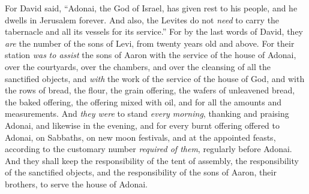 \begin{biblechapter}
\verse For David said, “Adonai, the God of Israel, has given rest to his people, and he dwells in Jerusalem forever.
\verse And also, the Levites do not \textit{need} to carry the tabernacle and all its vessels for its service.”
\verse For by the last words of David, they \textit{are} the number of the sons of Levi, from twenty years old and above.
\verse For their station \textit{was} \textit{to assist} the sons of Aaron with the service of the house of Adonai, over the courtyards, over the chambers, and over the cleansing of all the sanctified objects, and \textit{with} the work of the service of the house of God,
\verse and with the rows of bread, the flour, the grain offering, the wafers of unleavened bread, the baked offering, the offering mixed with oil, and for all the amounts and measurements.
\verse And \textit{they were} to stand \textit{every morning}, thanking and praising Adonai, and likewise in the evening,
\verse and for every burnt offering offered to Adonai, on Sabbaths, on new moon festivals, and at the appointed feasts, according to the customary number \textit{required of them}, regularly before Adonai.
\verse And they shall keep the responsibility of the tent of assembly, the responsibility of the sanctified objects, and the responsibility of the sons of Aaron, their brothers, to serve the house of Adonai.
\end{biblechapter}

